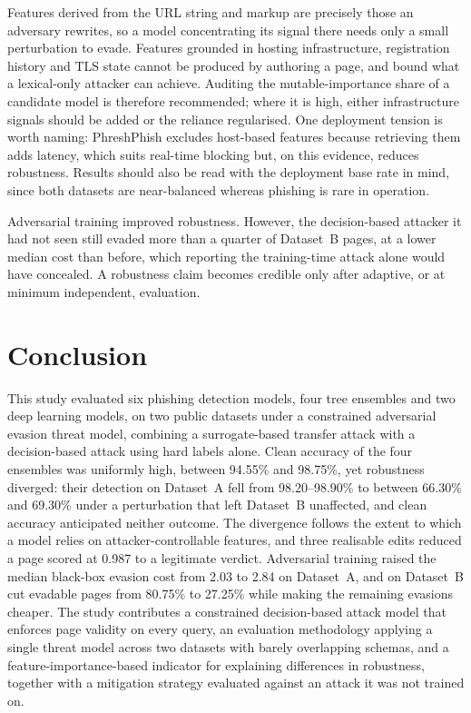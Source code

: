 \documentclass[runningheads]{llncs}
\begin{document}
Features derived from the URL string and markup are precisely those an adversary
rewrites, so a model concentrating its signal there needs only a small
perturbation to evade. Features grounded in hosting infrastructure, registration
history and TLS state cannot be produced by authoring a page, and bound what a
lexical-only attacker can achieve. Auditing the mutable-importance share of a
candidate model is therefore recommended; where it is high, either infrastructure
signals should be added or the reliance regularised. One deployment tension is
worth naming: PhreshPhish \cite{dalton2025} excludes host-based features because
retrieving them adds latency, which suits real-time blocking but, on this
evidence, reduces robustness. Results should also be read with the deployment
base rate in mind, since both datasets are near-balanced whereas phishing is rare
in operation.

Adversarial training improved robustness. However, the decision-based attacker
it had not seen still evaded more than a quarter of Dataset~B pages, at a lower
median cost than before, which reporting the training-time attack alone would
have concealed. A robustness claim becomes credible only after
adaptive, or at minimum independent, evaluation.

\section{Conclusion}
\label{sec:conclusion}

This study evaluated six phishing detection models, four tree ensembles and two
deep learning models, on two public datasets under a constrained adversarial
evasion threat model, combining a surrogate-based transfer attack with a
decision-based attack using hard labels alone. Clean accuracy of the four ensembles was uniformly
high, between 94.55\% and 98.75\%, yet robustness diverged: their detection on
Dataset~A fell from 98.20--98.90\% to between 66.30\% and 69.30\% under a perturbation that left Dataset~B unaffected, and clean
accuracy anticipated neither outcome. The divergence follows the extent to which
a model relies on attacker-controllable features, and three realisable edits
reduced a page scored at 0.987 to a legitimate verdict. Adversarial training
raised the median black-box evasion cost from 2.03 to 2.84 on Dataset~A, and on
Dataset~B cut evadable pages from 80.75\% to 27.25\% while making the remaining
evasions cheaper. The
study contributes a constrained decision-based attack model that enforces page
validity on every query, an evaluation methodology applying a single threat model
across two datasets with barely overlapping schemas, and a feature-importance-based
indicator for explaining differences in robustness, together with a mitigation
strategy evaluated against an attack it was not trained on.
\end{document}
